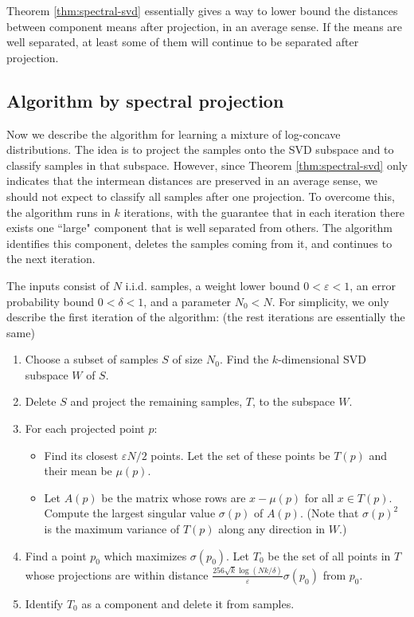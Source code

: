\documentclass[11pt,letter]{article}
\begin{document}
Theorem \ref{thm:spectral-svd} essentially gives a way to lower bound the distances between component means after projection, in an average sense. If the means are well separated, at least some of them will continue to be separated after projection.


\subsection{Algorithm by spectral projection}

Now we describe the algorithm for learning a mixture of log-concave distributions.
The idea is to project the samples onto the SVD subspace and to classify samples in that subspace. However, since Theorem \ref{thm:spectral-svd} only indicates that the intermean distances are preserved in an average sense, we should not expect to classify all samples after one projection.
To overcome this, the algorithm runs in $k$ iterations, with the guarantee that in each iteration there exists one ``large" component that is well separated from others. The algorithm identifies this component, deletes the samples coming from it, and continues to the next iteration.


The inputs consist of $N$ i.i.d. samples, a weight lower bound $0<\varepsilon<1$, an error probability bound $0<\delta<1$, and a parameter $N_0<N$. For simplicity, we only describe the first iteration of the algorithm: (the rest iterations are essentially the same)
\begin{enumerate}
\item Choose a subset of samples $S$ of size $N_0$. Find the $k$-dimensional SVD subspace $W$ of $S$.
\item Delete $S$ and project the remaining samples, $T$, to the subspace $W$.
\item For each projected point $p$:
\begin{itemize}
\item Find its closest $\varepsilon N/2$ points. Let the set of these points be $T(p)$ and their mean be $\mu(p)$.
\item Let $A(p)$ be the matrix whose rows are $x-\mu(p)$ for all $x\in T(p)$. Compute the largest singular value $\sigma(p)$ of $A(p)$. (Note that $\sigma(p)^2$ is the maximum variance of $T(p)$ along any direction in $W$.)
\end{itemize}
\item Find a point $p_0$ which maximizes $\sigma(p_0)$. Let $T_0$ be the set of all points in $T$ whose projections are within distance $\frac{256\sqrt k \log(Nk/\delta)}{\varepsilon} \sigma(p_0)$ from $p_0$.
\item Identify $T_0$ as a component and delete it from samples.
\end{enumerate}
\end{document}
